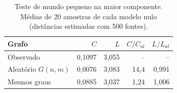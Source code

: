 \begin{table}
  \caption{Teste de mundo pequeno na maior componente. Médias de 20 amostras de cada modelo nulo (distâncias estimadas com 500 fontes).}
  \label{tab:smallworld}
  \small
  \begin{tabular}{lrrrr}
    \toprule
    Grafo & $C$ & $L$ & $C/C_{al}$ & $L/L_{al}$ \\
    \midrule
    Observado & 0,1097 & 3,055 & -- & -- \\
    Aleatório $G(n,m)$ & 0,0076 & 3,083 & 14,4 & 0,991 \\
    Mesmos graus & 0,0885 & 3,037 & 1,24 & 1,006 \\
    \bottomrule
  \end{tabular}
\end{table}
